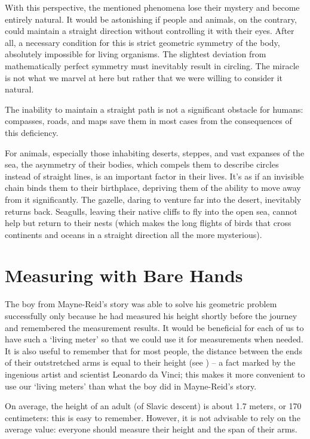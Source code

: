 With this perspective, the mentioned phenomena lose their mystery and become entirely natural. It would be astonishing if people and animals, on the contrary, could maintain a straight direction without controlling it with their eyes. After all, a necessary condition for this is strict geometric symmetry of the body, absolutely impossible for living organisms. The slightest deviation from mathematically perfect symmetry must inevitably result in circling. The miracle is not what we marvel at here but rather that we were willing to consider it natural.

The inability to maintain a straight path is not a significant obstacle for humans: compasses, roads, and maps save them in most cases from the consequences of this deficiency.

For animals, especially those inhabiting deserts, steppes, and vast expanses of the sea, the asymmetry of their bodies, which compels them to describe circles instead of straight lines, is an important factor in their lives. It's as if an invisible chain binds them to their birthplace, depriving them of the ability to move away from it significantly. The gazelle, daring to venture far into the desert, inevitably returns back. Seagulls, leaving their native cliffs to fly into the open sea, cannot help but return to their nests (which makes the long flights of birds that cross continents and oceans in a straight direction all the more mysterious).


\section{Measuring with Bare Hands}
\label{sec-8.8}

The boy from Mayne-Reid's story was able to solve his geometric problem successfully only because he had measured his height shortly before the journey and remembered the measurement results. It would be beneficial for each of us to have such a `living meter' so that we could use it for measurements when needed. It is also useful to remember that for most people, the distance between the ends of their outstretched arms is equal to their height (see ) -- a fact marked by the ingenious artist and scientist Leonardo da Vinci; this makes it more convenient to use our `living meters' than what the boy did in Mayne-Reid's story. 

On average, the height of an adult (of Slavic descent) is about 1.7 meters, or 170 centimeters: this is easy to remember. However, it is not advisable to rely on the average value: everyone should measure their height and the span of their arms.

